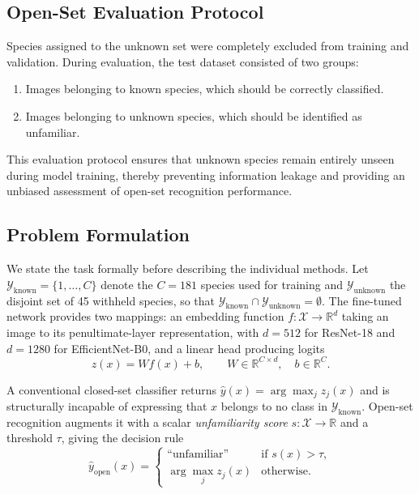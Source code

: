 \documentclass[11pt]{article}
\begin{document}
\subsection{Open-Set Evaluation Protocol}

Species assigned to the unknown set were completely excluded from training and validation. During evaluation, the test dataset consisted of two groups:

\begin{enumerate}
    \item Images belonging to known species, which should be correctly classified.
    \item Images belonging to unknown species, which should be identified as unfamiliar.
\end{enumerate}

This evaluation protocol ensures that unknown species remain entirely unseen during model training, thereby preventing information leakage and providing an unbiased assessment of open-set recognition performance.

\subsection{Problem Formulation}
\label{sec:formulation}

We state the task formally before describing the individual methods. Let $\mathcal{Y}_{\text{known}} = \{1, \dots, C\}$ denote the $C = 181$ species used for training and $\mathcal{Y}_{\text{unknown}}$ the disjoint set of 45 withheld species, so that $\mathcal{Y}_{\text{known}} \cap \mathcal{Y}_{\text{unknown}} = \emptyset$. The fine-tuned network provides two mappings: an embedding function $f: \mathcal{X} \to \mathbb{R}^d$ taking an image to its penultimate-layer representation, with $d = 512$ for ResNet-18 and $d = 1280$ for EfficientNet-B0, and a linear head producing logits
\begin{equation}
z(x) = W f(x) + b, \qquad W \in \mathbb{R}^{C \times d}, \quad b \in \mathbb{R}^{C}.
\end{equation}

A conventional closed-set classifier returns $\hat{y}(x) = \arg\max_j z_j(x)$ and is structurally incapable of expressing that $x$ belongs to no class in $\mathcal{Y}_{\text{known}}$. Open-set recognition augments it with a scalar \emph{unfamiliarity score} $s: \mathcal{X} \to \mathbb{R}$ and a threshold $\tau$, giving the decision rule
\begin{equation}
\hat{y}_{\text{open}}(x) =
\begin{cases}
\text{``unfamiliar''} & \text{if } s(x) > \tau, \\[2pt]
\arg\max_j z_j(x) & \text{otherwise.}
\end{cases}
\end{equation}
\end{document}
